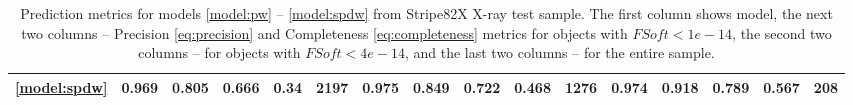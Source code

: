 \documentclass[fleqn,usenatbib]{mnras}
\begin{document}
\begin{table}
\begin{tabular}{lllllrllllrllllr}
            \ref{model:spdw} &                    \textbf{0.969} &  \textbf{0.805} &  \textbf{0.666} &  \textbf{0.34} &        2197 &                    \textbf{0.975} &  \textbf{0.849} &  \textbf{0.722} &  \textbf{0.468} &        1276 &                   \textbf{0.974} &  \textbf{0.918} &  \textbf{0.789} &  \textbf{0.567} &         208 \\
            \hline
            \end{tabular}            \caption{Prediction metrics for models \ref{model:pw} -- \ref{model:spdw} from Stripe82X X-ray test sample. The first column shows model, the next two columns -- Precision \ref{eq:precision} and Completeness \ref{eq:completeness} metrics for objects with $FSoft < 1e-14$, the second two columns -- for objects with $FSoft < 4e-14$, and the last two columns -- for the entire sample.}
\end{table}
\end{document}
